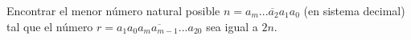 Encontrar el menor número natural posible $n = \overline{a_m ...a_2a_1a_0} $ (en sistema decimal) tal que el número $r = \overline{a_1a_0a_ma_{m-1} ...a_20} $ sea igual a $2n$.
